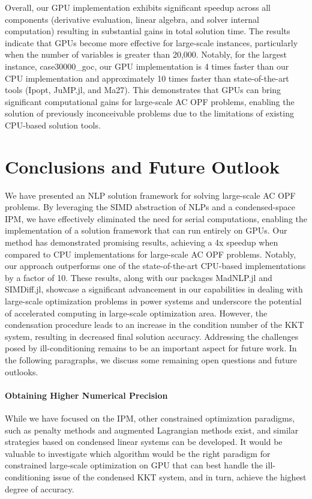 Overall, our GPU implementation exhibits significant speedup across
all components (derivative evaluation, linear algebra, and solver
internal computation) resulting in substantial gains in total solution
time. The results indicate that GPUs become more effective for
large-scale instances, particularly when the number of variables is
greater than 20,000. Notably, for the largest instance,
case30000\_goc, our GPU implementation is 4 times faster than our CPU
implementation and approximately 10 times faster than
state-of-the-art tools (Ipopt, JuMP.jl, and Ma27).
This demonstrates that GPUs can bring significant computational
gains for large-scale AC OPF problems, enabling the solution of
previously inconceivable problems due to the limitations of existing
CPU-based solution tools.


\section{Conclusions and Future Outlook}\label{sec:conc}
We have presented an NLP solution framework for solving large-scale AC
OPF problems. By leveraging the SIMD abstraction of NLPs and a
condensed-space IPM, we have effectively eliminated the need for
serial computations, enabling the implementation of a solution
framework that can run entirely on GPUs. Our method has demonstrated
promising results, achieving a 4x speedup when compared to CPU
implementations for large-scale AC OPF problems. Notably, our approach
outperforms one of the state-of-the-art CPU-based implementations by
a factor of 10. These results, along with our packages
MadNLP.jl and SIMDiff.jl, showcase a significant advancement in our
capabilities in dealing with large-scale optimization problems in
power systems and underscore the potential of accelerated computing in
large-scale optimization area. However, the condensation procedure
leads to an increase in the condition number of the KKT system,
resulting in decreased final solution accuracy. Addressing the
challenges posed by ill-conditioning remains to be an important aspect
for future work. In the following paragraphs, we discuss some
remaining open questions and future outlooks.

\paragraph*{Obtaining Higher Numerical Precision}
While we have focused on the IPM, other constrained optimization
paradigms, such as penalty methods and augmented Lagrangian methods
exist, and similar strategies based on condensed linear systems can be
developed. It would be valuable to investigate which algorithm would
be the right paradigm for constrained large-scale optimization on GPU
that can best handle the ill-conditioning issue of the condensed KKT
system, and in turn, achieve the highest degree of accuracy.

